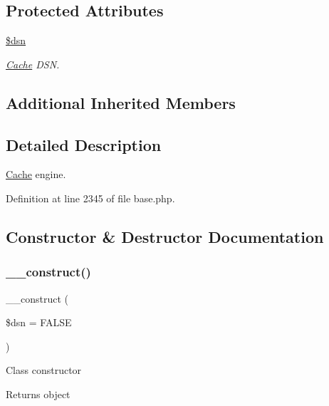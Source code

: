 \subsection*{Protected Attributes}
\begin{DoxyCompactItemize}
\item 
\hypertarget{class_cache_a6441cca8c9fa11e16d2017e8cb733c10}{}\label{class_cache_a6441cca8c9fa11e16d2017e8cb733c10} 
\hyperlink{class_cache_a6441cca8c9fa11e16d2017e8cb733c10}{\$dsn}
\begin{DoxyCompactList}\small\item\em \hyperlink{class_cache}{Cache} D\+SN. \end{DoxyCompactList}\end{DoxyCompactItemize}
\subsection*{Additional Inherited Members}


\subsection{Detailed Description}
\hyperlink{class_cache}{Cache} engine. 

Definition at line 2345 of file base.\+php.



\subsection{Constructor \& Destructor Documentation}
\hypertarget{class_cache_a53b443dea5ef4422f7335a380e654c98}{}\label{class_cache_a53b443dea5ef4422f7335a380e654c98} 
\subsubsection{\texorpdfstring{\+\_\+\+\_\+construct()}{\_\_construct()}}
{\footnotesize\ttfamily \+\_\+\+\_\+construct (\begin{DoxyParamCaption}\item[{}]{\$dsn = {\ttfamily FALSE} }\end{DoxyParamCaption})}

Class constructor \begin{DoxyReturn}{Returns}
object 
\end{DoxyReturn}

